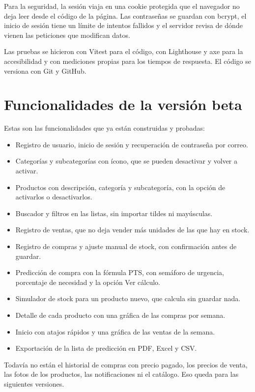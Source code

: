 \documentclass[12pt,letterpaper]{article}
\begin{document}
Para la seguridad, la sesión viaja en una cookie protegida que el navegador no deja leer desde el código de la página. Las contraseñas se guardan con bcrypt, el inicio de sesión tiene un límite de intentos fallidos y el servidor revisa de dónde vienen las peticiones que modifican datos.

Las pruebas se hicieron con Vitest para el código, con Lighthouse y axe para la accesibilidad y con mediciones propias para los tiempos de respuesta. El código se versiona con Git y GitHub.

\section{Funcionalidades de la versión beta}

Estas son las funcionalidades que ya están construidas y probadas:

\begin{itemize}
\item Registro de usuario, inicio de sesión y recuperación de contraseña por correo.
\item Categorías y subcategorías con ícono, que se pueden desactivar y volver a activar.
\item Productos con descripción, categoría y subcategoría, con la opción de activarlos o desactivarlos.
\item Buscador y filtros en las listas, sin importar tildes ni mayúsculas.
\item Registro de ventas, que no deja vender más unidades de las que hay en stock.
\item Registro de compras y ajuste manual de stock, con confirmación antes de guardar.
\item Predicción de compra con la fórmula PTS, con semáforo de urgencia, porcentaje de necesidad y la opción Ver cálculo.
\item Simulador de stock para un producto nuevo, que calcula sin guardar nada.
\item Detalle de cada producto con una gráfica de las compras por semana.
\item Inicio con atajos rápidos y una gráfica de las ventas de la semana.
\item Exportación de la lista de predicción en PDF, Excel y CSV.
\end{itemize}

Todavía no están el historial de compras con precio pagado, los precios de venta, las fotos de los productos, las notificaciones ni el catálogo. Eso queda para las siguientes versiones.
\end{document}
